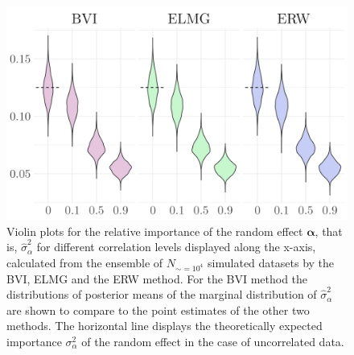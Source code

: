 \begin{figure}[ht]
  \centering
  \includegraphics[width=0.7\linewidth]{Figures/ViolinPlots/Variance_gamma.png}
  \caption[Relative importance of the random effect $\boldsymbol{\alpha}$ in Gaussian LMM]{Violin plots for the relative importance of the random effect $\boldsymbol{\alpha}$, that is, $\hat{\sigma}^2_{\alpha}$ for different correlation levels displayed along the x-axis, calculated from the ensemble of $N_{\sim=10^4}$ simulated datasets by the BVI, ELMG and the ERW method. For the BVI method the distributions of posterior means of the marginal distribution of $\hat{\sigma}^2_{\alpha}$ are shown to compare to the point estimates of the other two methods. The horizontal line displays the theoretically expected importance $\sigma^2_{\alpha}$ of the random effect in the case of uncorrelated data.}
  \label{fig:relimp_alpha}
\end{figure}

